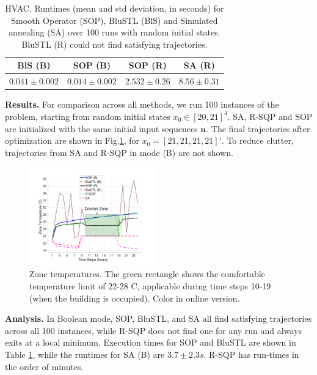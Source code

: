 \begin{table}[tb]
\small
\begin{center}
\caption{{\small HVAC. Runtimes (mean and std deviation, in seconds) for Smooth Operator (SOP), BluSTL (BlS) and Simulated annealing (SA) over 100 runs with random initial states. BluSTL (R) could not find satisfying trajectories.}}
\vspace{-5pt}
\label{tbl:time_performance_bldg}
\begin{tabular} {|c|c|c|c|}
	\hline
	BlS (B) & SOP (B) & SOP (R) & SA (R) \\ \hline
	 $0.041 \pm 0.002$ &  $\mathbf{0.014 \pm 0.002}$  &  $2.532 \pm 0.26$ & $8.56 \pm 0.31$ \\ \hline 
\end{tabular}	
\end{center}
\vspace{-10pt}
\end{table}



\textbf{Results.} For comparison across all methods, we run 100 instances of the problem, starting from random initial states $x_0 \in [20,21]^4$. SA, R-SQP and SOP are initialized with the same initial input sequences $\mathbf{u}$. 
The final trajectories after optimization are shown in Fig.\ref{fig:ZoneTemp}, for $x_0 = [21,21,21,21]'$. To reduce clutter, trajectories from SA and R-SQP in mode (B) are not shown.

\begin{figure}[t]
\centering
\includegraphics[width=0.49\textwidth]{figures/ZoneTempFinal}
\vspace{-20pt}
\caption{\small{Zone temperatures. The green rectangle shows the comfortable temperature limit of 22-28 C, applicable during time steps 10-19 (when the building is occupied). Color in online version.}}
\label{fig:ZoneTemp}
\vspace{-10pt}
\end{figure}


\textbf{Analysis.} 
In Boolean mode, SOP, BluSTL, and SA all find satisfying trajectories across all 100 instances, while R-SQP does not find one for any run and always exits at a local minimum. 
Execution times for SOP and BluSTL are shown in Table \ref{tbl:time_performance_bldg}, while the runtimes for SA (B) are $3.7 \pm 2.3s$.
 R-SQP has run-times in the order of minutes. 
 
